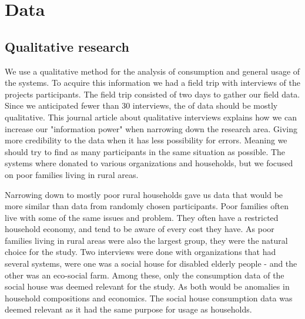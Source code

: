 
\chapter{Data}
\label{ch:data}
\section{Qualitative research}
We use a qualitative method for the analysis of consumption and general usage of the systems. To acquire this information we had a field trip with interviews of the projects participants. The field trip consisted of two days to gather our field data. Since we anticipated fewer than 30 interviews, the of data should be mostly qualitative. This journal article about qualitative interviews \citep{malterudSampleSizeQualitative2016} explains how we can increase our "information power" when narrowing down the research area. Giving more credibility to the data when it has less possibility for errors. Meaning we should try to find as many participants in the same situation as possible. The systems where donated to various organizations and households, but we focused on poor families living in rural areas.

Narrowing down to mostly poor rural households gave us data that would be more similar than data from randomly chosen participants. Poor families often live with some of the same issues and problem. They often have a restricted household economy, and tend to be aware of every cost they have. As poor families living in rural areas were also the largest group, they were the natural choice for the study. Two interviews were done with organizations that had several systems, were one was a social house for disabled elderly people - and the other was an eco-social farm. Among these, only the consumption data of the social house was deemed relevant for the study. As both would be anomalies in household compositions and economics. The social house consumption data was deemed relevant as it had the same purpose for usage as households.


